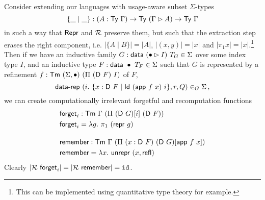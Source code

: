 Consider extending our languages with usage-aware
subset $\Sigma$-types
\[
\{ \_ \mid \_ \} : (A : \textsf{Ty}\ \Gamma) \to \textsf{Ty}\ (\Gamma \rhd A) \to \textsf{Ty}\ \Gamma
\]
in such a way that $\textsf{Repr}$ and $\mathcal{R}$ preserve them, but such that the extraction
step erases the right component, i.e. $|\{A \mid B\}| = |A|$, $|(x, y)| = |x|$ and $|\pi_1 x| =
|x|$.\footnote{This can be implemented using quantitative type theory for example.}
Then if we have an inductive family $G : \textsf{data}\ (\bullet \rhd I)\ T_G
\in \Sigma$ over some index type $I$, and an inductive type $F : \mta{data}\ \bullet\
T_F \in \Sigma$ such that $G$ is represented by a refinement $f : \textsf{Tm}\
(\Sigma,\bullet)\ (\Pi\ (\textsf{D}\ F)\ I)$ of $F$,
\[
    \textsf{data-rep}\ (i.\ \{ x : \textsf{D}\ F \mid \textsf{Id}\ (\textsf{app}\ f\ x)\ i \}, r, Q) \in_G \Sigma \,,
\]
we can create computationally irrelevant forgetful and recomputation functions
\begin{align*}
&\mta{forget}_i : \Tm\ \Gamma\ (\Pi\ (\mta{D}\ G)[i]\ (\mta{D}\ F)) \\
&\mta{forget}_i = \lambda g.\ \pi_1\ (\mta{repr}\ g) \\[1em]
&\mta{remember} : \Tm\ \Gamma\ (\Pi\ (x : \mta{D}\ F)\ (\mta{D}\ G)[\mta{app}\ f\ x]) \\
&\mta{remember} = \lambda x.\ \mta{unrepr}\ (x, \mta{refl})
\end{align*}
Clearly $|\R\ \mta{forget}_i| = |\R\ \mta{remember}| = \texttt{id}$.
